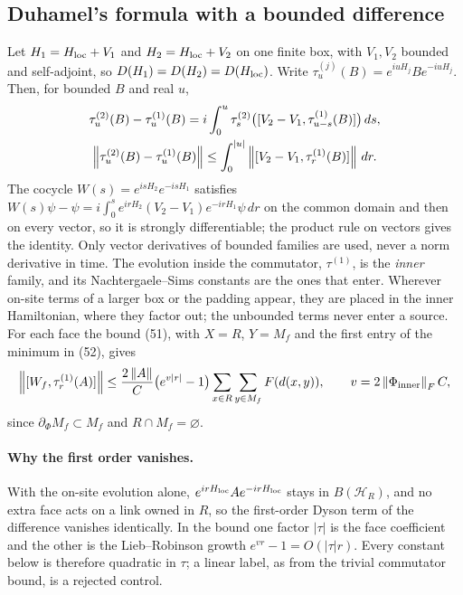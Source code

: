 \subsection{Duhamel's formula with a bounded difference}
\label{sec:ba2-duhamel}
Let $H_1=H_{\rm loc}+V_1$ and $H_2=H_{\rm loc}+V_2$ on one finite box, with
$V_1,V_2$ bounded and self-adjoint, so $D(H_1)=D(H_2)=D(H_{\rm loc})$. Write
$\tau^{(j)}_u(B)=e^{iuH_j}Be^{-iuH_j}$. Then, for bounded $B$ and real $u$,
\begin{equation}
 \begin{gathered}
 \tau^{(2)}_u(B)-\tau^{(1)}_u(B)=i\int_0^u\tau^{(2)}_s\bigl([V_2-V_1,\tau^{(1)}_{u-s}(B)]\bigr)\,ds,\\
 \left\lVert\tau^{(2)}_u(B)-\tau^{(1)}_u(B)\right\rVert\le\int_0^{|u|}\left\lVert[V_2-V_1,\tau^{(1)}_r(B)]\right\rVert\,dr .
 \end{gathered}
 \label{eq:ba2-duhamel}
\end{equation}
The cocycle $W(s)=e^{isH_2}e^{-isH_1}$ satisfies
$W(s)\psi-\psi=i\int_0^se^{irH_2}(V_2-V_1)e^{-irH_1}\psi\,dr$ on the common
domain and then on every vector, so it is strongly differentiable; the
product rule on vectors gives the identity. Only vector derivatives of bounded
families are used, never a norm derivative in time. The evolution inside the
commutator, $\tau^{(1)}$, is the \emph{inner} family, and its
Nachtergaele--Sims constants are the ones that enter. Wherever on-site terms
of a larger box or the padding appear, they are placed in the inner
Hamiltonian, where they factor out; the unbounded terms never enter a source.
For each face the bound (51), with $X=R$, $Y=M_f$ and the first entry of the
minimum in (52), gives
\begin{equation}
 \left\lVert[W_f,\tau^{(1)}_r(A)]\right\rVert\le\frac{2\left\lVert A\right\rVert}{C}\bigl(e^{v|r|}-1\bigr)
 \sum_{x\in R}\sum_{y\in M_f}F(d(x,y)),\qquad v=2\left\lVert\Phi_{\rm inner}\right\rVert_FC,
 \label{eq:ba2-perface}
\end{equation}
since $\partial_\Phi M_f\subset M_f$ and $R\cap M_f=\varnothing$.

\paragraph{Why the first order vanishes.} With the on-site evolution alone,
$e^{irH_{\rm loc}}Ae^{-irH_{\rm loc}}$ stays in $B(\mathcal H_R)$, and no
extra face acts on a link owned in $R$, so the first-order Dyson term of the
difference vanishes identically. In the bound one factor $|\tau|$ is the face
coefficient and the other is the Lieb--Robinson growth $e^{vr}-1=O(|\tau|r)$.
Every constant below is therefore quadratic in $\tau$; a linear label, as
from the trivial commutator bound, is a rejected control.

